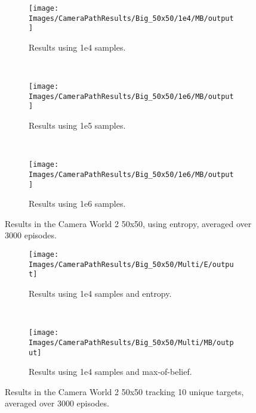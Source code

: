 \begin{figure}[ht]
        \centering
        \begin{subfigure}[t]{0.3\textwidth}
                \texttt{[image: Images/CameraPathResults/Big\_50x50/1e4/MB/output]}
                \caption{Results using 1e4 samples.}
                \label{fig:cpb4mb}
        \end{subfigure}%
        ~ %
        \begin{subfigure}[t]{0.3\textwidth}
                \texttt{[image: Images/CameraPathResults/Big\_50x50/1e6/MB/output]}
                \caption{Results using 1e5 samples.}
                \label{fig:cpb5mb}
        \end{subfigure}
        ~ %
        \begin{subfigure}[t]{0.3\textwidth}
                \texttt{[image: Images/CameraPathResults/Big\_50x50/1e6/MB/output]}
                \caption{Results using 1e6 samples.}
                \label{fig:cpb6mb}
        \end{subfigure}
        \caption{Results in the Camera World 2 50x50, using entropy, averaged over 3000 episodes.}\label{fig:cpbmb}
\end{figure}

\begin{figure}[ht]
        \centering
        \begin{subfigure}[t]{0.5\textwidth}
                \texttt{[image: Images/CameraPathResults/Big\_50x50/Multi/E/output]}
                \caption{Results using 1e4 samples and entropy.}
                \label{fig:cpb4e10}
        \end{subfigure}%
        ~ %
        \begin{subfigure}[t]{0.5\textwidth}
                \texttt{[image: Images/CameraPathResults/Big\_50x50/Multi/MB/output]}
                \caption{Results using 1e4 samples and max-of-belief.}
                \label{fig:cpb5mb10}
        \end{subfigure}
        \caption{Results in the Camera World 2 50x50 tracking 10 unique targets, averaged over 3000 episodes.}\label{fig:cpb10}
\end{figure}
